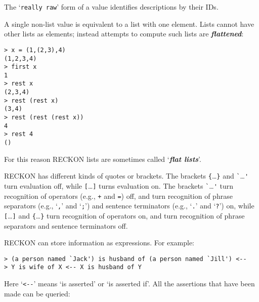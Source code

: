 \documentclass[12pt]{article}
\newcommand{\key}[1]{{\bf \em #1}\index{#1}}
\newcommand{\skey}[2]{{\bf \em #1#2}\index{#1}}
\newenvironment{indpar}[1][0.3in]%
	{\begin{list}{}%
		     {\setlength{\itemsep}{0in}%
		      \setlength{\topsep}{0in}%
		      \setlength{\parsep}{1ex}%
		      \setlength{\labelwidth}{#1}%
		      \setlength{\leftmargin}{#1}%
		      \addtolength{\leftmargin}{\labelsep}}%
	 \item}%
	{\end{list}}
\begin{document}
The `{\tt really raw}' form of a value identifies descriptions by their IDs.

A single non-list value is equivalent to a list with one element.
Lists cannot have other lists as elements; instead attempts to
compute such lists are \key{flattened}:

\begin{indpar}
\verb|> x = (1,(2,3),4)| \\
\verb|(1,2,3,4)| \\
\verb|> first x| \\
\verb|1| \\
\verb|> rest x| \\
\verb|(2,3,4)| \\
\verb|> rest (rest x)| \\
\verb|(3,4)| \\
\verb|> rest (rest (rest x))| \\
\verb|4| \\
\verb|> rest 4| \\
\verb|()|
\end{indpar}

For this reason RECKON lists are sometimes called `\skey{flat list}s'.

RECKON has different kinds of quotes or brackets.  The brackets
\verb|{|\ldots\verb|}| and \verb|`|\ldots\verb|'|
turn
evaluation off, while \verb|[|\ldots\verb|]| turns evaluation on.
The brackets \verb|`|\ldots\verb|'| turn
recognition of operators (e.g., \verb|+| and \verb|=|) off, and turn
recognition of phrase separators (e.g., `\verb|,|' and `\verb|;|') and
sentence terminators (e.g., `\verb|.|' and `\verb|?|') on, while
\verb|[|\ldots\verb|]| and \verb|{|\ldots\verb|}|
turn recognition of operators on, and turn recognition of phrase
separators and sentence terminators off.

RECKON can store information as expressions.  For example:

\begin{indpar}
\verb|> (a person named `Jack') is husband of (a person named `Jill') <--| \\
\verb|> Y is wife of X <-- X is husband of Y|
\end{indpar}

Here `\verb|<--|' means `is asserted' or `is asserted if'.
All the assertions that have been made can be queried:
\end{document}
